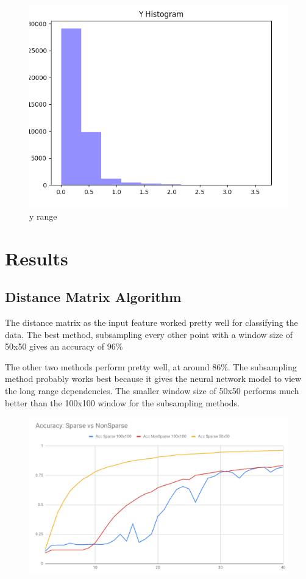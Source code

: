 \documentclass[12pt, a4paper, twocolumn, fullpage]{article}
\theoremstyle{plain}
\theoremstyle{definition}
\theoremstyle{remark}
\begin{document}
\begin{figure}
	\includegraphics[width=\linewidth]{yhist.png}
	\caption{y range}
	\label{fig:boat1}
\end{figure}


\section{Results}

\subsection{Distance Matrix Algorithm}
	The distance matrix as the input feature worked pretty well for classifying the data. The best method, subsampling every other point with a window size of 50x50 gives an accuracy of 96\%
	
	The other two methods perform pretty well, at around 86\%.
	The subsampling method probably works best because it gives the neural network model to view the long range dependencies.
	The smaller window size of 50x50 performs much better than the 100x100 window for the subsampling methods.	
	
	\begin{figure}[t]
	  \includegraphics[width=\linewidth]{AccSparsevsNonSparse.png}
	  \caption{}
	  \label{fig:network}
	\end{figure}
	
\end{document}
